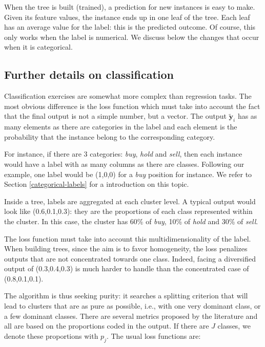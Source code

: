 \documentclass[]{krantz}
\theoremstyle{definition}
\theoremstyle{definition}
\theoremstyle{definition}
\theoremstyle{remark}
\begin{document}
When the tree is built (trained), a prediction for new instances is easy
to make. Given its feature values, the instance ends up in one leaf of
the tree. Each leaf has an average value for the label: this is the
predicted outcome. Of course, this only works when the label is
numerical. We discuss below the changes that occur when it is
categorical.

\hypertarget{further-details-on-classification}{%
\subsection{Further details on
classification}\label{further-details-on-classification}}

Classification exercises are somewhat more complex than regression
tasks. The most obvious difference is the loss function which must take
into account the fact that the final output is not a simple number, but
a vector. The output \(\tilde{\textbf{y}}_i\) has as many elements as
there are categories in the label and each element is the probability
that the instance belong to the corresponding category.

For instance, if there are 3 categories: \emph{buy}, \emph{hold} and
\emph{sell}, then each instance would have a label with as many columns
as there are classes. Following our example, one label would be (1,0,0)
for a \emph{buy} position for instance. We refer to Section
\ref{categorical-labels} for a introduction on this topic.

Inside a tree, labels are aggregated at each cluster level. A typical
output would look like (0.6,0.1,0.3): they are the proportions of each
class represented within the cluster. In this case, the cluster has 60\%
of \emph{buy}, 10\% of \emph{hold} and 30\% of \emph{sell}.

The loss function must take into account this multidimensionality of the
label. When building trees, since the aim is to favor homogeneity, the
loss penalizes outputs that are not concentrated towards one class.
Indeed, facing a diversified output of (0.3,0.4,0.3) is much harder to
handle than the concentrated case of (0.8,0.1,0.1).

The algorithm is thus seeking purity: it searches a splitting criterion
that will lead to clusters that are as pure as possible, i.e., with one
very dominant class, or a few dominant classes. There are several
metrics proposed by the literature and all are based on the proportions
coded in the output. If there are \(J\) classes, we denote these
proportions with \(p_j\). The usual loss functions are:
\end{document}
